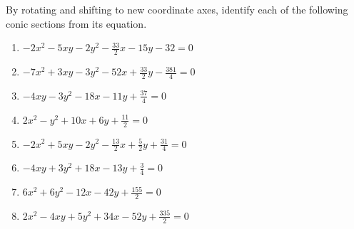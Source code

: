 \begin{exercise} \label{ex:} 
By rotating and shifting to new coordinate axes, identify each of the following conic sections from its equation.
\begin{enumerate}
\item \( -2x^2 -5xy -2y^2 -\frac{33}2x -15y -32=0\)

\item \( -7x^2 +3xy -3y^2 -52x +\frac{33}2y -\frac{381}4=0\)

\item \( -4xy -3y^2 -18x -11y +\frac{37}4=0\)

\item \( 2x^2 -y^2 +10x +6y +\frac{11}2=0\)

\item \( -2x^2 +5xy -2y^2 -\frac{13}2x +\frac52y +\frac{31}4=0\)

\item \(-4xy +3y^2 +18x -13y +\frac34=0\)

\item \( 6x^2 +6y^2 -12x -42y +\frac{155}2=0\)

\item \( 2x^2 -4xy +5y^2 +34x -52y +\frac{335}2=0\)


\end{enumerate}
\end{exercise}






